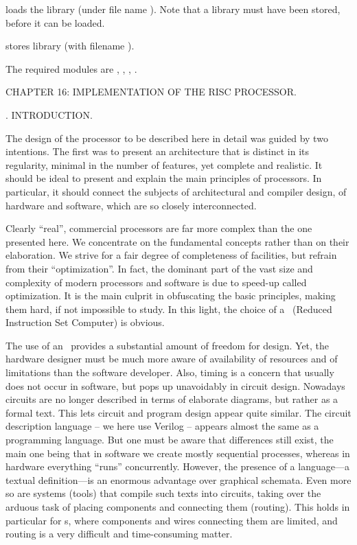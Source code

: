  loads the library  (under file name ). Note that a library must have been stored, before it can be loaded.

 stores library  (with filename ).

The required modules are , , , .

\beginchapter CHAPTER 16: IMPLEMENTATION OF THE RISC PROCESSOR.

. INTRODUCTION.

The design of the processor to be described here in detail was guided by two intentions. The first was to present an architecture that is distinct in its regularity, minimal in the number of features, yet complete and realistic. It should be ideal to present and explain the main principles of processors. In particular, it should connect the subjects of architectural and compiler design, of hardware and software, which are so closely interconnected.

Clearly ``real'', commercial processors are far more complex than the one presented here. We concentrate on the fundamental concepts rather than on their elaboration. We strive for a fair degree of completeness of facilities, but refrain from their ``optimization''. In fact, the dominant part of the vast size and complexity of modern processors and software is due to speed-up called optimization. It is the main culprit in obfuscating the basic principles, making them hard, if not impossible to study. In this light, the choice of a \RISC\ (Reduced Instruction Set Computer) is obvious.

The use of an \FPGA\ provides a substantial amount of freedom for design. Yet, the hardware designer must be much more aware of availability of resources and of limitations than the software developer. Also, timing is a concern that usually does not occur in software, but pops up unavoidably in circuit design. Nowadays circuits are no longer described in terms of elaborate diagrams, but rather as a formal text. This lets circuit and program design appear quite similar. The circuit description language – we here use Verilog – appears almost the same as a programming language. But one must be aware that differences still exist, the main one being that in software we create mostly sequential processes, whereas in hardware everything ``runs'' concurrently. However, the presence of a language---a textual definition---is an enormous advantage over graphical schemata. Even more so are systems (tools) that compile such texts into circuits, taking over the arduous task of placing components and connecting them (routing). This holds in particular for \FPGA{}s, where components and wires connecting them are limited, and routing is a very difficult and time-consuming matter.

